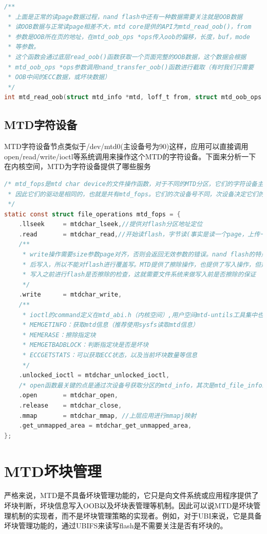 \begin{lstlisting}[language=C]
/**
 * 上面是正常的读page数据过程，nand flash中还有一种数据需要关注就是OOB数据
 * 读OOB数据与正常读page相差不大，mtd core提供的API为mtd_read_oob()，from
 * 参数是OOB所在页的地址，在mtd_oob_ops *ops传入oob的偏移，长度，buf，mode
 * 等参数。
 * 这个函数会通过底层read_oob()函数获取一个页面完整的OOB数据，这个数据会根据
 * mtd_oob_ops *ops参数调用nand_transfer_oob()函数进行截取（有时我们只需要
 * OOB中间的ECC数据，或坏块数据）
 */
int mtd_read_oob(struct mtd_info *mtd, loff_t from, struct mtd_oob_ops *ops) 
\end{lstlisting}


\clearpage

\subsection{MTD字符设备}
MTD字符设备节点类似于/dev/mtd0(主设备号为90)这样，应用可以直接调用open/read/write/ioctl等系统调用来操作这个MTD的字符设备。下面来分析一下在内核空间，MTD为字符设备提供了哪些服务
\begin{lstlisting}[language=C]
/* mtd_fops是mtd char device的文件操作函数，对于不同的MTD分区，它们的字符设备主设备号都是90。
 * 因此它们的驱动是相同的，也就是共有mtd_fops。它们的次设备号不同，次设备决定它们的设备文件是什么
 */
static const struct file_operations mtd_fops = {
	.llseek		= mtdchar_lseek,//提供对flash分区地址定位
	.read		= mtdchar_read,//开始读flash，字节读(事实是读一个page，上传一个字节而已)
	/**
	 * write操作需要size参数page对齐，否则会返回无效参数的错误。nand flash的特点是先擦除，
	 * 后写入，所以不能对flash进行覆盖写。MTD提供了擦除操作，也提供了写入操作，但并不会在
	 * 写入之前进行flash是否擦除的检查，这就需要文件系统来做写入前是否擦除的保证
	 */
	.write		= mtdchar_write,
	/**
	 * ioctl的command定义在mtd_abi.h（内核空间）,用户空间mtd-untils工具集中也在mtd_abi.h中
	 * MEMGETINFO：获取mtd信息（推荐使用sysfs读取mtd信息）
	 * MEMERASE：擦除指定块
	 * MEMGETBADBLOCK：判断指定块是否是坏块
	 * ECCGETSTATS：可以获取ECC状态，以及当前坏块数量等信息
	 */
	.unlocked_ioctl	= mtdchar_unlocked_ioctl,
	/* open函数最关键的点是通过次设备号获取分区的mtd_info，其次是mtd_file_info结构体初始化 */
	.open		= mtdchar_open, 
	.release	= mtdchar_close,
	.mmap		= mtdchar_mmap, //上层应用进行mmapj映射
	.get_unmapped_area = mtdchar_get_unmapped_area,
};
\end{lstlisting}

\clearpage
\section{MTD坏块管理}
严格来说，MTD是不具备坏块管理功能的，它只是向文件系统或应用程序提供了坏块判断，坏块信息写入OOB以及坏块表管理等机制。因此可以说MTD是坏块管理机制的实现者，而不是坏块管理策略的实现者。例如，对于UBI来说，它是具备坏块管理功能的，通过UBIFS来读写flash是不需要关注是否有坏块的。

